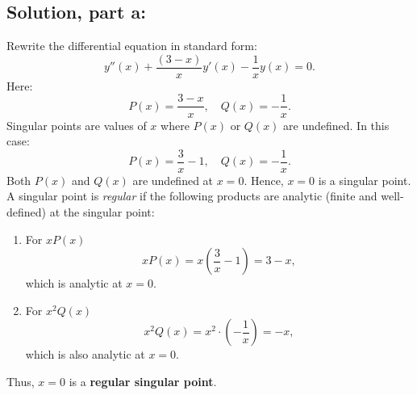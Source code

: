 \documentclass[12pt]{article}
\begin{document}
    \subsection*{Solution, part a:}
        Rewrite the differential equation in standard form:
        \[
        y''(x) + \frac{(3 - x)}{x} y'(x) - \frac{1}{x} y(x) = 0.
        \]
        Here:
        \[
        P(x) = \frac{3 - x}{x}, \quad Q(x) = -\frac{1}{x}.
        \]
        Singular points are values of \(x\) where \(P(x)\) or \(Q(x)\) are undefined. In this case:
        \[
        P(x) = \frac{3}{x} - 1, \quad Q(x) = -\frac{1}{x}.
        \]
        Both \(P(x)\) and \(Q(x)\) are undefined at \(x = 0\). Hence, \(x = 0\) is a singular point.
        A singular point is \textit{regular} if the following products are analytic (finite and well-defined) at the singular point:
        \begin{enumerate}
            \item For $xP(x)$
                \[
                    xP(x) = x \left(\frac{3}{x} - 1\right) = 3 - x,
                \]
                which is analytic at \(x = 0\).
            \item For $x^2 Q(x)$
                \[
                    x^2 Q(x) = x^2 \cdot \left(-\frac{1}{x}\right) = -x,
                \]
                which is also analytic at \(x = 0\).
        \end{enumerate}        
        Thus, \(x = 0\) is a \textbf{regular singular point}.
\end{document}
